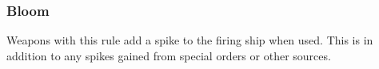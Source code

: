 \subsubsection{Bloom}
Weapons with this rule add a spike to the firing ship when used. This is in addition to any spikes gained from special orders or other sources.